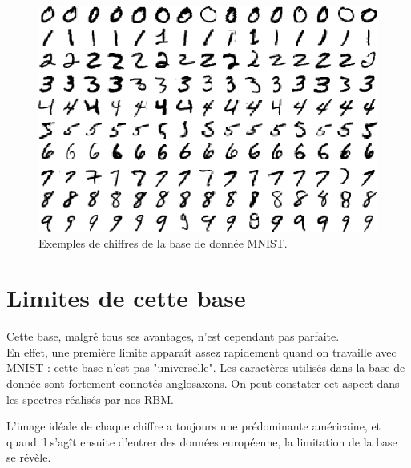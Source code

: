 \documentclass[a4paper,oneside]{report}
\begin{document}
                \begin{figure}
                    \begin{center}
                        \includegraphics{Images/mnist-01.png}
                    \end{center}
                    \caption{Exemples de chiffres de la base de donnée MNIST.}
                \end{figure}


            \section{Limites de cette base}

                Cette base, malgré tous ses avantages, n'est cependant pas parfaite.\\

                En effet, une première limite apparaît assez rapidement quand on travaille avec MNIST 
: cette base n'est pas "universelle". Les caractères utilisés dans la base de donnée 
sont fortement connotés 
anglosaxons. On peut constater cet aspect dans les spectres réalisés par nos RBM.

                L'image idéale de chaque chiffre a toujours une prédominante américaine, et quand il 
s'agît ensuite d'entrer des données européenne, la limitation de la base se révèle.\\
\end{document}
